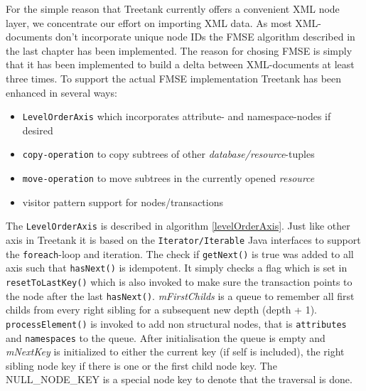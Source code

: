 For the simple reason that Treetank currently offers a convenient XML node layer, we concentrate our effort on importing XML data. As most XML-documents don't incorporate unique node IDs the FMSE algorithm described in the last chapter has been implemented. The reason for chosing FMSE is simply that it has been implemented to build a delta between XML-documents at least three times. To support the actual FMSE implementation Treetank has been enhanced in several ways:

\begin{itemize}
\item \texttt{LevelOrderAxis} which incorporates attribute- and namespace-nodes if desired
\item \texttt{copy-operation} to copy subtrees of other \emph{database/resource}-tuples
\item \texttt{move-operation} to move subtrees in the currently opened \emph{resource}
\item visitor pattern support for nodes/transactions
\end{itemize}

The \texttt{LevelOrderAxis} is described in algorithm \ref{levelOrderAxis}. Just like other axis in Treetank it is based on the \texttt{Iterator/Iterable} Java interfaces to support the \texttt{foreach}-loop and iteration. The check if \texttt{getNext()} is true was added to all axis such that \texttt{hasNext()} is idempotent. It simply checks a flag which is set in \texttt{resetToLastKey()} which is also invoked to make sure the transaction points to the node after the last \texttt{hasNext()}. \emph{mFirstChilds} is a queue to remember all first childs from every right sibling for a subsequent new depth (depth + 1). \texttt{processElement()} is invoked to add non structural nodes, that is \texttt{attributes} and \texttt{namespaces} to the queue. After initialisation the queue is empty and \emph{mNextKey} is initialized to either the current key (if self is included), the right sibling node key if there is one or the first child node key. The NULL\_NODE\_KEY is a special node key to denote that the traversal is done.

